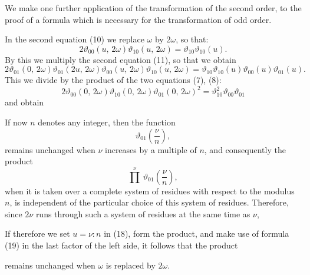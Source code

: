 We make one further application of the transformation of the second order, to the proof of a formula which is necessary for the transformation of odd order.

In the second equation (10) we replace $\omega$ by $2\omega$, so that:
\[
2\vartheta_{00}(u,\,2\omega)\vartheta_{10}(u,\,2\omega) = \vartheta_{10}\vartheta_{10}(u).
\]
By this we multiply the second equation (11), so that we obtain
\[
2\vartheta_{01}(0,\,2\omega)\vartheta_{01}(2u,\,2\omega)\vartheta_{00}(u,\,2\omega)\vartheta_{10}(u,\,2\omega)
= \vartheta_{10}\vartheta_{10}(u)\vartheta_{00}(u)\vartheta_{01}(u).
\]
This we divide by the product of the two equations (7), (8):
\[
2\vartheta_{00}(0,\,2\omega)\vartheta_{10}(0,\,2\omega)\vartheta_{01}(0,\,2\omega)^2 = \vartheta_{10}^2\vartheta_{00}\vartheta_{01}
\]
and obtain


If now $n$ denotes any  integer, then the function
\[
\vartheta_{01}\left(\frac{\nu}{n}\right),
\]
remains unchanged when $\nu$ increases by a multiple of $n$, and consequently the product
\[
\overset{\nu}{\prod}\ \vartheta_{01}\left(\frac{\nu}{n}\right),
\]
when it is taken over a complete system of residues with respect to the modulus $n$, is independent of the particular choice of this system of residues. Therefore, since $2\nu$ runs through such a system of residues at the same time as $\nu$,


If therefore we set $u = \nu:n$ in (18), form the product, and make use of formula (19) in the last factor of the left side, it follows that the product


remains unchanged when $\omega$ is replaced by $2\omega$.
